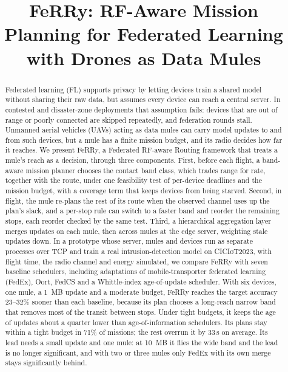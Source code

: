\documentclass[conference]{IEEEtran}
\begin{document}
\title{FeRRy: RF-Aware Mission Planning for Federated Learning with Drones as Data Mules}

\maketitle

\begin{abstract}
Federated learning (FL) supports privacy by letting devices train a shared model
without sharing their raw data, but assumes every device can reach a central
server. In contested and disaster-zone deployments that assumption fails:
devices that are out of range or poorly connected are skipped repeatedly, and
federation rounds stall. Unmanned aerial vehicles (UAVs) acting as data mules can
carry model updates to and from such devices, but a mule has a finite mission
budget, and its radio decides how far it reaches. We present FeRRy, a
Federated RF-aware Routing framework that treats a mule's reach as a decision,
through three components. First, before each flight, a band-aware mission planner
chooses the contact band class, which trades range for rate, together with the
route, under one feasibility test of per-device deadlines and the mission budget,
with a coverage term that keeps devices from being starved. Second, in flight,
the mule re-plans the rest of its route when the observed channel uses up the
plan's slack, and a per-stop rule can switch to a faster band and reorder the
remaining stops, each reorder checked by the same test. Third, a hierarchical
aggregation layer merges updates on each mule, then across mules at the edge
server, weighting stale updates down. In a prototype whose server, mules and
devices run as separate processes over TCP and train a real intrusion-detection
model on CICIoT2023, with flight time, the radio channel and energy simulated, we
compare FeRRy with seven baseline schedulers, including adaptations of
mobile-transporter federated learning (FedEx), Oort, FedCS and a Whittle-index
age-of-update scheduler. With six devices, one mule, a 1~MB update and a moderate
budget, FeRRy
reaches the target accuracy 23--32\% sooner than each baseline, because its plan
chooses a long-reach narrow band that removes most of the transit between stops.
Under tight budgets, it keeps the age of updates about a quarter lower than
age-of-information schedulers. Its plans stay within a tight budget in 71\% of
missions; the rest overrun it by 33\,s on average. Its lead needs a small update
and one mule: at 10~MB it flies the wide band and the lead is no longer
significant, and with two or three mules only FedEx with its own merge stays
significantly behind.
\end{abstract}
\end{document}
